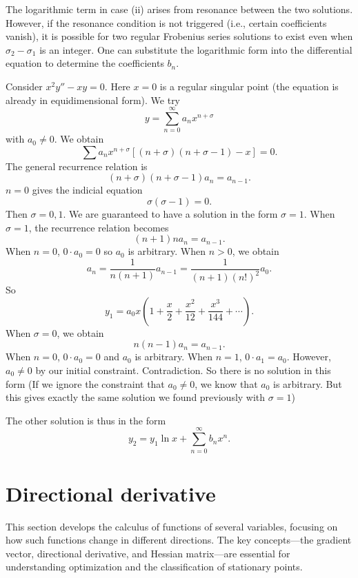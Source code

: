 \documentclass[a4paper]{article}
\begin{document}
\begin{remark}
  The logarithmic term in case (ii) arises from resonance between the two solutions. However, if the resonance condition is not triggered (i.e., certain coefficients vanish), it is possible for two regular Frobenius series solutions to exist even when $\sigma_2 - \sigma_1$ is an integer. One can substitute the logarithmic form into the differential equation to determine the coefficients $b_n$.
\end{remark}
\begin{eg}
  Consider $x^2 y'' - xy = 0$. Here $x = 0$ is a regular singular point (the equation is already in equidimensional form). We try
  \[
    y = \sum_{n = 0}^\infty a_n x^{n + \sigma}
  \]
  with $a_0 \not= 0$. We obtain
  \[
    \sum a_nx^{n + \sigma}[(n + \sigma)(n + \sigma - 1) - x] = 0.
  \]
  The general recurrence relation is
  \[
    (n + \sigma)(n + \sigma - 1)a_n = a_{n - 1}.
  \]
  $n = 0$ gives the indicial equation
  \[
    \sigma(\sigma - 1) = 0.
  \]
  Then $\sigma = 0, 1$. We are guaranteed to have a solution in the form $\sigma = 1$. When $\sigma = 1$, the recurrence relation becomes
  \[
    (n + 1)n a_n = a_{n - 1}.
  \]
  When $n = 0$, $0\cdot a_0 = 0$ so $a_0$ is arbitrary.
  When $n > 0$, we obtain
  \[
    a_n = \frac{1}{n(n +1)}a_{n - 1} = \frac{1}{(n + 1)(n!)^2}a_0.
  \]
  So
  \[
    y_1 = a_0x\left(1 + \frac{x}{2} + \frac{x^2}{12} + \frac{x^3}{144} + \cdots \right).
  \]
  When $\sigma = 0$, we obtain
  \[
    n(n - 1)a_n = a_{n - 1}.
  \]
  When $n = 0$, $0\cdot a_0 = 0$ and $a_0$ is arbitrary. When $n = 1$, $0\cdot a_1 = a_0$. However, $a_0\not= 0$ by our initial constraint. Contradiction. So there is no solution in this form (If we ignore the constraint that $a_0\not= 0$, we know that $a_0$ is arbitrary. But this gives exactly the same solution we found previously with $\sigma = 1$)

  The other solution is thus in the form
  \[
    y_2 = y_1\ln x + \sum_{n = 0}^\infty b_nx^n.
  \]
\end{eg}
\section{Directional derivative}
\label{sec:directional-derivative}
\begin{remark}[Overview]
  This section develops the calculus of functions of several variables, focusing on how such functions change in different directions. The key concepts---the gradient vector, directional derivative, and Hessian matrix---are essential for understanding optimization and the classification of stationary points.
\end{remark}
\end{document}

